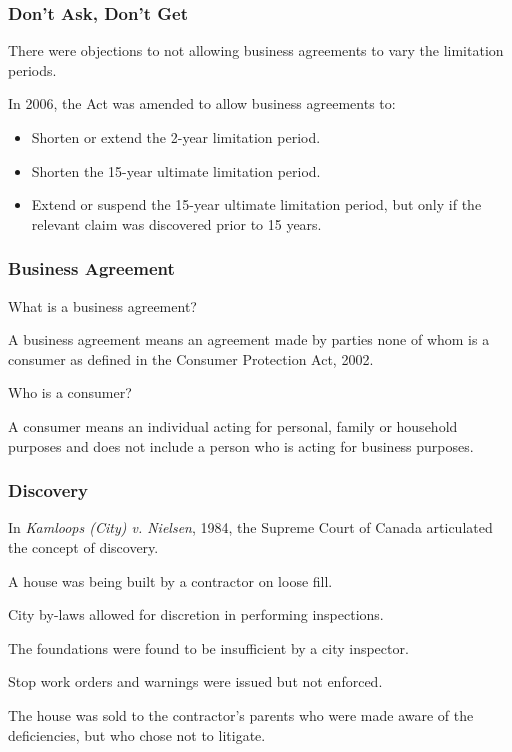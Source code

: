 \begin{frame}
\frametitle{Don't Ask, Don't Get}

There were objections to not allowing business agreements to vary the limitation periods.

In 2006, the Act was amended to allow business agreements to:

\begin{itemize}
	\item Shorten or extend the 2-year limitation period.
	\item Shorten the 15-year ultimate limitation period.
	\item Extend or suspend the 15-year ultimate limitation period, but only if the relevant claim was discovered prior to 15 years.
\end{itemize}
\end{frame}


\begin{frame}
\frametitle{Business Agreement}

What is a business agreement?

A \alert{business agreement} means an agreement made by parties none of whom is a consumer as defined in the Consumer Protection Act, 2002.

Who is a consumer?

A \alert{consumer} means an individual acting for personal, family or household purposes and does not include a person who is acting for business purposes.

\end{frame}



\begin{frame}
\frametitle{Discovery}

In \textit{Kamloops (City) v. Nielsen}, 1984, the Supreme Court of Canada articulated the concept of discovery.

A house was being built by a contractor on loose fill.

City by-laws allowed for discretion in performing inspections.

The foundations were found to be insufficient by a city inspector.

Stop work orders and warnings were issued but not enforced.

The house was sold to the contractor's parents who were made aware of the deficiencies, but who chose not to litigate.

\end{frame}



